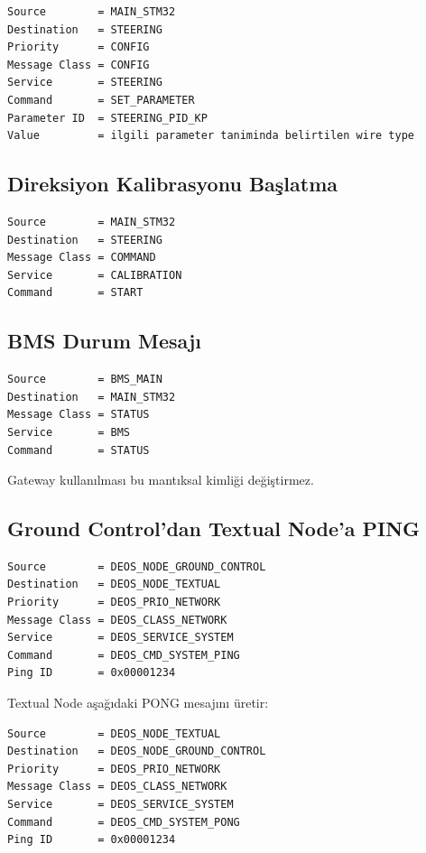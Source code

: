 \documentclass[a4paper,10pt]{article}
\begin{document}
\begin{verbatim}
Source        = MAIN_STM32
Destination   = STEERING
Priority      = CONFIG
Message Class = CONFIG
Service       = STEERING
Command       = SET_PARAMETER
Parameter ID  = STEERING_PID_KP
Value         = ilgili parameter taniminda belirtilen wire type
\end{verbatim}

\subsection{Direksiyon Kalibrasyonu Başlatma}

\begin{verbatim}
Source        = MAIN_STM32
Destination   = STEERING
Message Class = COMMAND
Service       = CALIBRATION
Command       = START
\end{verbatim}

\subsection{BMS Durum Mesajı}

\begin{verbatim}
Source        = BMS_MAIN
Destination   = MAIN_STM32
Message Class = STATUS
Service       = BMS
Command       = STATUS
\end{verbatim}

Gateway kullanılması bu mantıksal kimliği değiştirmez.


\subsection{Ground Control'dan Textual Node'a PING}

\begin{verbatim}
Source        = DEOS_NODE_GROUND_CONTROL
Destination   = DEOS_NODE_TEXTUAL
Priority      = DEOS_PRIO_NETWORK
Message Class = DEOS_CLASS_NETWORK
Service       = DEOS_SERVICE_SYSTEM
Command       = DEOS_CMD_SYSTEM_PING
Ping ID       = 0x00001234
\end{verbatim}

Textual Node aşağıdaki PONG mesajını üretir:

\begin{verbatim}
Source        = DEOS_NODE_TEXTUAL
Destination   = DEOS_NODE_GROUND_CONTROL
Priority      = DEOS_PRIO_NETWORK
Message Class = DEOS_CLASS_NETWORK
Service       = DEOS_SERVICE_SYSTEM
Command       = DEOS_CMD_SYSTEM_PONG
Ping ID       = 0x00001234
\end{verbatim}
\end{document}
